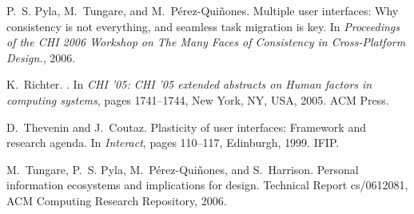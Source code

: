 \documentclass[twocolumn,final,10pt]{article}
\begin{document}
\begin{thebibliography}{10}
P.~S. Pyla, M.~Tungare, and M.~P\'erez-Qui\~nones.
\newblock Multiple user interfaces: Why consistency is not everything, and
  seamless task migration is key.
\newblock In {\em Proceedings of the CHI 2006 Workshop on The Many Faces of
  Consistency in Cross-Platform Design.}, 2006.

K.~Richter.
.
\newblock In {\em CHI '05: CHI '05 extended abstracts on Human factors in
  computing systems}, pages 1741--1744, New York, NY, USA, 2005. ACM Press.

D.~Thevenin and J.~Coutaz.
\newblock Plasticity of user interfaces: Framework and research agenda.
\newblock In {\em Interact}, pages 110--117, Edinburgh, 1999. IFIP.

M.~Tungare, P.~S. Pyla, M.~P\'erez-Qui\~nones, and S.~Harrison.
\newblock Personal information ecosystems and implications for design.
\newblock Technical Report cs/0612081, ACM Computing Research Repository, 2006.

\end{thebibliography}
\end{document}
